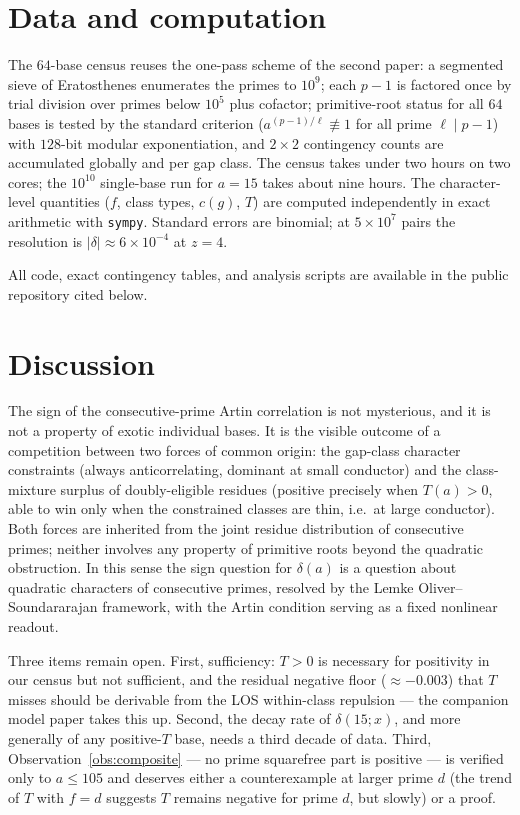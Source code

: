 \documentclass[11pt,reqno]{amsart}
\theoremstyle{plain}
\theoremstyle{definition}
\begin{document}
\section{Data and computation}
\label{sec:computation}

The $64$-base census reuses the one-pass scheme of the second paper: a
segmented sieve of Eratosthenes enumerates the primes to $10^9$; each
$p - 1$ is factored once by trial division over primes below $10^5$ plus
cofactor; primitive-root status for all $64$ bases is tested by the standard
criterion ($a^{(p-1)/\ell} \not\equiv 1$ for all prime $\ell \mid p-1$) with
$128$-bit modular exponentiation, and $2 \times 2$ contingency counts are
accumulated globally and per gap class. The census takes under two hours on
two cores; the $10^{10}$ single-base run for $a = 15$ takes about nine
hours. The character-level quantities ($f$, class types, $c(g)$, $T$) are
computed independently in exact arithmetic with \texttt{sympy}. Standard
errors are binomial; at $5 \times 10^7$ pairs the resolution is
$|\delta| \approx 6 \times 10^{-4}$ at $z = 4$.

All code, exact contingency tables, and analysis scripts are available in
the public repository cited below.

\section{Discussion}
\label{sec:discussion}

The sign of the consecutive-prime Artin correlation is not mysterious, and
it is not a property of exotic individual bases. It is the visible outcome
of a competition between two forces of common origin: the gap-class
character constraints (always anticorrelating, dominant at small conductor)
and the class-mixture surplus of doubly-eligible residues (positive
precisely when $T(a) > 0$, able to win only when the constrained classes are
thin, i.e.\ at large conductor). Both forces are inherited from the joint
residue distribution of consecutive primes; neither involves any property of
primitive roots beyond the quadratic obstruction. In this sense the sign
question for $\delta(a)$ is a question about quadratic characters of
consecutive primes, resolved by the Lemke Oliver--Soundararajan framework,
with the Artin condition serving as a fixed nonlinear readout.

Three items remain open. First, sufficiency: $T > 0$ is necessary for
positivity in our census but not sufficient, and the residual negative floor
($\approx -0.003$) that $T$ misses should be derivable from the LOS
within-class repulsion --- the companion model paper takes this up. Second,
the decay rate of $\delta(15;x)$, and more generally of any positive-$T$
base, needs a third decade of data. Third, Observation~\ref{obs:composite}
--- no prime squarefree part is positive --- is verified only to $a \le 105$
and deserves either a counterexample at larger prime $d$ (the trend of $T$
with $f = d$ suggests $T$ remains negative for prime $d$, but slowly) or a
proof.
\end{document}
